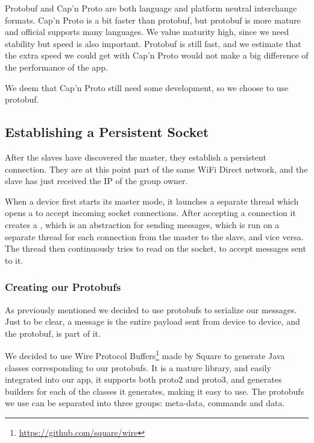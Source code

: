 Protobuf and Cap'n Proto are both language and platform neutral interchange formats.
Cap'n Proto is a bit faster than protobuf, but protobuf is more mature and official supports many languages.
We value maturity high, since we need stability but speed is also important.
Protobuf is still fast, and we estimate that the extra speed we could get with Cap'n Proto would not make a big difference of the performance of the app.

We deem that Cap'n Proto still need some development, so we choose to use protobuf.

\subsection{Establishing a Persistent Socket}

After the slaves have discovered the master, they establish a persistent connection.
They are at this point part of the same WiFi Direct network, and the slave has just received the IP of the group owner.

When a device first starts its master mode, it launches a separate thread which opens a  to accept incoming socket connections.
After accepting a connection it creates a , which is an abstraction for sending messages, which is run on a separate thread for each connection from the master to the slave, and vice versa.
The thread then continuously tries to read on the socket, to accept messages sent to it.

\subsubsection*{Creating our Protobufs}
As previously mentioned we decided to use protobufs to serialize our messages.
Just to be clear, a message is the entire payload sent from device to device, and the protobuf, is part of it.

We decided to use Wire Protocol Buffers\footnote{\url{https://github.com/square/wire}} made by Square to generate Java classes corresponding to our protobufs.
It is a mature library, and easily integrated into our app, it supports both proto2 and proto3, and generates builders for each of the classes it generates, making it easy to use.
The protobufs we use can be separated into three groups: meta-data, commands and data.

